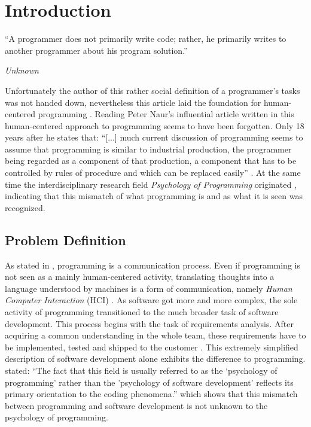 \chapter{Introduction}
\label{chap:introduction}
\epigraph{``A programmer does not primarily write code; rather, he primarily writes to another programmer about his program solution.''}{\textit{Unknown}}
\noindent
Unfortunately the author of this rather social definition of a programmer's tasks was not handed down, nevertheless this article laid the foundation for human-centered programming \autocite{anonymous_what_1967}.
Reading Peter Naur's influential article  written in \citeyear{naur_programming_1985} \autocite{naur_programming_1985} this human-centered approach to programming seems to have been forgotten. Only 18 years after  he states that: ``[...] much current discussion of programming seems to assume that programming is similar to industrial production, the programmer being regarded as a component of that production, a component that has to be controlled by rules of procedure and which can be replaced easily'' \autocite{naur_programming_1985}.
At the same time the interdisciplinary research field \emph{Psychology of Programming} originated \autocite{myers_past_2009}, indicating that this mismatch of what programming is and as what it is seen was recognized.


\section{Problem Definition}
\label{sec:problem-definition}
As stated in \textcite{anonymous_what_1967}, programming is a communication process.
Even if programming is not seen as a mainly human-centered activity, translating thoughts into a language understood by machines is a form of communication, namely \emph{Human Computer Interaction} (HCI) \autocite{myers_past_2009}.
As software got more and more complex, the sole activity of programming transitioned to the much broader task of software development.
This process begins with the task of requirements analysis.
After acquiring a common understanding in the whole team, these requirements have to be implemented, tested and shipped to the customer \autocite{mayr_projekt_2005}.
This extremely simplified description of software development alone exhibits the difference to programming.
\citeauthor{curtis_psychology_1990} stated: ``The fact that this field is usually referred to as the `psychology of programming' rather than the 'psychology of software development' reflects its primary orientation to the coding phenomena.'' \autocite[267]{curtis_psychology_1990} which shows that this mismatch between programming and software development is not unknown to the psychology of programming.


